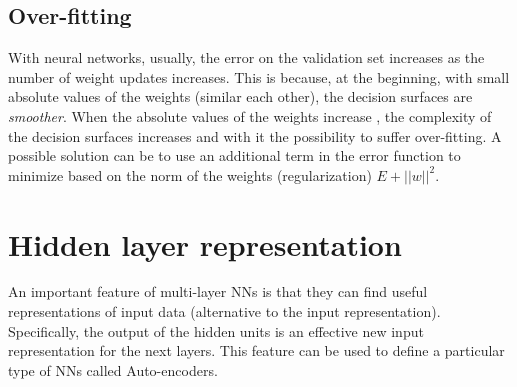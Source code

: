 \subsection{Over-fitting}
With neural networks, usually, the error on the validation set increases as the number of weight updates increases. This is because, at the beginning, with small absolute values of the weights (similar each other), the decision surfaces are \textit{smoother}. When the absolute values of the weights increase , the complexity of the decision surfaces increases and with it the possibility to suffer over-fitting. \newline\newline
A possible solution can be to use an additional term in the error function to minimize based on the norm of the weights (regularization) $E + ||w||^{2}$.

\section{Hidden layer representation}
An important feature of multi-layer NNs is that they can find useful representations of input data (alternative to the input representation). Specifically, the output of the hidden units is an effective new input representation for the next layers. This feature can be used to define a particular type of NNs called Auto-encoders.

